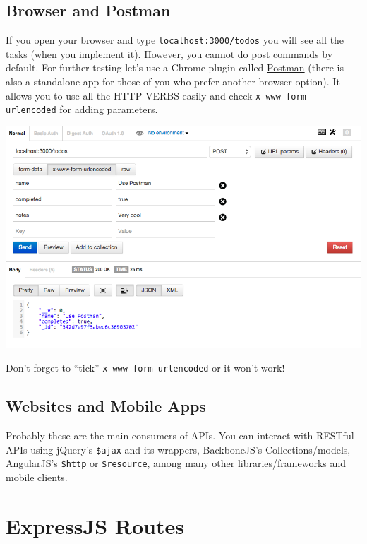 \documentclass[12pt]{article}
\begin{document}
\subsection{Browser and Postman}

If you open your browser and type \texttt{localhost:3000/todos} you will
see all the tasks (when you implement it). However, you cannot do post
commands by default. For further testing let's use a Chrome plugin
called
\href{https://chrome.google.com/webstore/detail/postman-rest-client/fdmmgilgnpjigdojojpjoooidkmcomcm?hl=en}{Postman} (there is also a standalone app 
for those of you who prefer another browser option).
It allows you to use all the HTTP VERBS easily and check
\texttt{x-www-form-urlencoded} for adding parameters.

\includegraphics[width=\textwidth]{images/postman_post.png}

Don't forget to ``tick'' \texttt{x-www-form-urlencoded} or it won't work!

\subsection{Websites and Mobile Apps}

Probably these are the main consumers of APIs. You can interact with
RESTful APIs using jQuery's \texttt{\$ajax} and its wrappers,
BackboneJS's Collections/models, AngularJS's \texttt{\$http} or
\texttt{\$resource}, among many other libraries/frameworks and mobile
clients.

\section{ExpressJS Routes}
\end{document}
